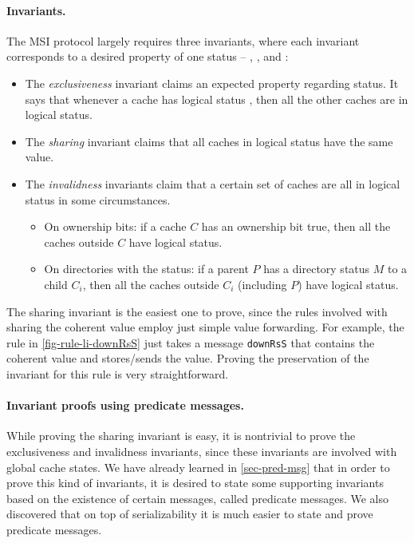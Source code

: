 \documentclass[sigplan,10pt,review,anonymous,screen]{acmart}\settopmatter{printfolios=true,printccs=false,printacmref=false}
\def\slstinline{\lstinline[basicstyle=\ttfamily\small]}
\begin{document}
\paragraph{Invariants.}
The MSI protocol largely requires three invariants, where each invariant corresponds to a desired property of one status -- \stM{}, \stS{}, and \stI{}:
\begin{itemize}[leftmargin=*]
\item The \emph{exclusiveness} invariant claims an expected property regarding \stM{} status.
  It says that whenever a cache has logical status \stM{}, then all the other caches are in logical \stI{} status.
\item The \emph{sharing} invariant claims that all caches in logical \stS{} status have the same value.
\item The \emph{invalidness} invariants claim that a certain set of caches are all in logical \stI{} status in some circumstances.
  \begin{itemize}[leftmargin=*]
  \item On ownership bits: if a cache $C$ has an ownership bit true, then all the caches outside $C$ have logical \stI{} status.
  \item On directories with the \stM{} status: if a parent $P$ has a directory status $M$ to a child $C_i$, then all the caches outside $C_i$ (including $P$) have logical \stI{} status.
  \end{itemize}
\end{itemize}

The sharing invariant is the easiest one to prove, since the rules involved with sharing the coherent value employ just simple value forwarding.
For example, the rule in \autoref{fig-rule-li-downRsS} just takes a message \slstinline{downRsS} that contains the coherent value and stores/sends the value.
Proving the preservation of the invariant for this rule is very straightforward.

\paragraph{Invariant proofs using predicate messages.}

While proving the sharing invariant is easy, it is nontrivial to prove the exclusiveness and invalidness invariants, since these invariants are involved with global cache states.
We have already learned in \autoref{sec-pred-msg} that in order to prove this kind of invariants, it is desired to state some supporting invariants based on the existence of certain messages, called predicate messages.
We also discovered that on top of serializability it is much easier to state and prove predicate messages.
\end{document}
